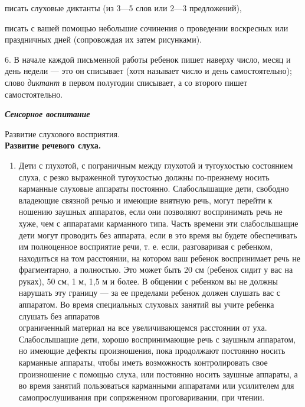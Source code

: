 \documentclass[a5paper]{book}
\renewcommand{\emph}[1]{\textit{#1}}
\begin{document}
писать слуховые диктанты (из 3---5 слов или 2---3 предложений),

писать с вашей помощью небольшие сочинения о проведении воскресных или
праздничных дней (сопровождая их затем рисунками).

6. В начале каждой письменной работы ребенок пишет наверху число, месяц
и день недели --- это он списывает (хотя называет число и день
самостоятельно); слово \emph{диктант} в первом полугодии списывает, а со
второго пишет самостоятельно.

\emph{\textbf{Сенсорное воспитание}}

Развитие слухового восприятия.\\
\textbf{Развитие речевого слуха.}


\begin{enumerate}
\def\labelenumi{\arabic{enumi}.}
\item
  
  Дети с глухотой, с пограничным между глухотой и тугоухостью состоянием
  слуха, с резко выраженной тугоухостью должны по-прежнему носить
  карманные слуховые аппараты постоянно. Слабослышащие дети, свободно
  владеющие связной речью и имеющие внятную речь, могут перейти к
  ношению заушных аппаратов, если они позволяют воспринимать речь не
  хуже, чем с аппаратами карманного типа. Часть времени эти
  слабослышащие дети могут проводить без аппарата, если в это время вы
  будете обеспечивать им полноценное восприятие речи, т. е. если,
  разговаривая с ребенком, находиться на том расстоянии, на котором ваш
  ребенок воспринимает речь не фрагментарно, а полностью. Это может быть
  20 см (ребенок сидит у вас на руках), 50 см, 1 м, 1,5 м и более. В
  общении с ребенком вы не должны нарушать эту границу --- за ее
  пределами ребенок должен слушать вас с аппаратом. Во время специальных
  слуховых занятий вы учите ребенка слушать без аппаратов\\
  ограниченный материал на все увеличивающемся расстоянии от уха.
  Слабослышащие дети, хорошо воспринимающие речь с заушным аппаратом, но
  имеющие дефекты произношения, пока продолжают постоянно носить
  карманные аппараты, чтобы иметь возможность контролировать свое
  произношение с помощью слуха, или постоянно носить заушные аппараты, а
  во время занятий пользоваться карманными аппаратами или усилителем для
  самопрослушивания при сопряженном проговаривании, при чтении.
  
\end{enumerate}
\end{document}
